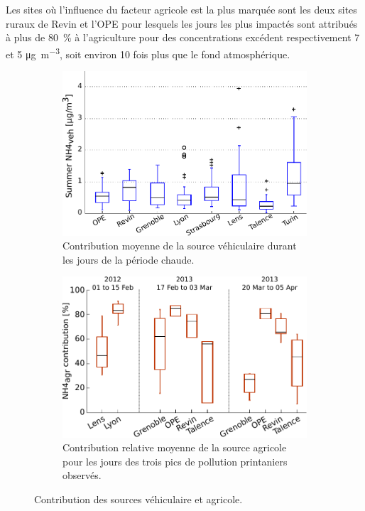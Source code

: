 Les sites où l'influence du facteur agricole est la plus marquée sont les deux sites
ruraux de Revin et l'OPE pour lesquels les jours les plus impactés sont attribués à plus
de 80~\% à l'agriculture pour des concentrations excédent respectivement 7 et 5
\si{\micro\g\per\cubic\meter}, soit environ 10 fois plus que le fond atmosphérique.

\begin{figure}[ht]
    \begin{subfigure}[t]{0.5\textwidth}
    \begin{center}
    \includegraphics[width=.9\textwidth]{figures/INACS/MCA_contribSummerVeh.pdf}
    \end{center}
    \caption{Contribution moyenne de la source véhiculaire durant les jours de la période chaude.}
    \label{fig:summerNH4}
    \end{subfigure}
    \begin{subfigure}[t]{0.5\textwidth}
    \begin{center}
    \includegraphics[width=.9\textwidth]{figures/INACS/MCA_contribSpringEventAgr.pdf}
    \end{center}
    \caption{Contribution relative moyenne de la source agricole pour les jours des trois
    pics de pollution printaniers observés.}
    \label{fig:contribSpringAgr}
    \end{subfigure}
    \caption{Contribution des sources véhiculaire et agricole.}
\end{figure}

